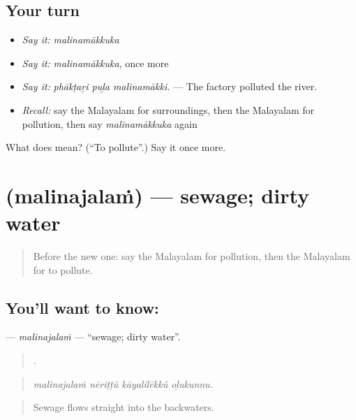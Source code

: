 \subsection*{Your turn}
\begin{itemize}
\raggedright
  \item \emph{Say it:} \emph{malinamākkuka}
  \item \emph{Say it:} \emph{malinamākkuka}, once more
  \item \emph{Say it:} \emph{phākṭaṟi puḻa malinamākki.} — The factory polluted the river.
  \item \emph{Recall:} say the Malayalam for surroundings, then the Malayalam for pollution, then say \emph{malinamākkuka} again
\end{itemize}

\begin{tcolorbox}[breakable,colback=teal!4,colframe=teal!35!black,title={Before you move on}]
What does  mean? (\textquotedblleft{}To pollute\textquotedblright{}.) Say it once more.
\end{tcolorbox}
\section[\texorpdfstring{\ml{മലിനജലം} (malinajalaṁ)}{മലിനജലം (malinajalaṁ)}]{ (malinajalaṁ) — sewage; dirty water}

\label{lesson:ML-C503-malinajalam}



\begin{quote}
Before the new one: say the Malayalam for pollution, then the Malayalam for to pollute.
\end{quote}

\subsection*{You'll want to know: }
\textbf{} — \emph{malinajalaṁ} — \textquotedblleft{}sewage; dirty water\textquotedblright{}.

\begin{quote}
   .
\end{quote}

\begin{quote}
\emph{malinajalaṁ nēriṭṭŭ kāyalilēkkŭ oḻukunnu.}
\end{quote}

\begin{quote}
Sewage flows straight into the backwaters.
\end{quote}

